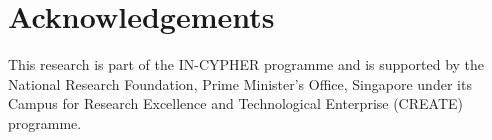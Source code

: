 \documentclass{article}
\begin{document}
\vspace{-0.5em}
\section*{Acknowledgements}
This research is part of the IN-CYPHER programme and is supported by the National Research Foundation, Prime Minister's Office, Singapore under its Campus for Research Excellence and Technological Enterprise (CREATE) programme.



\end{document}
